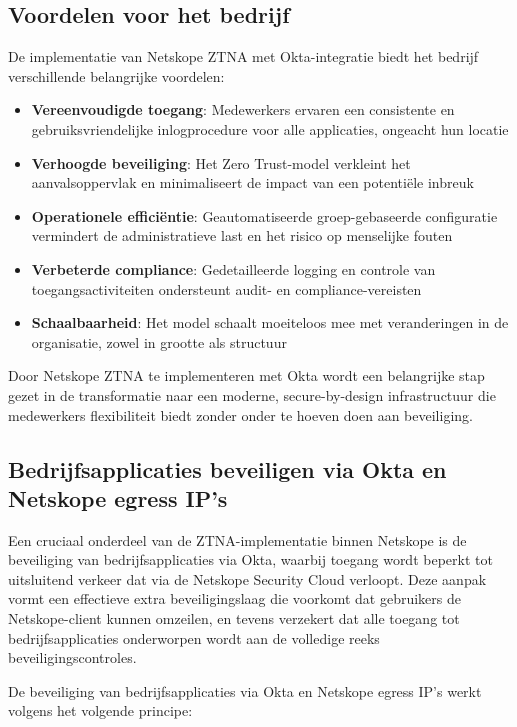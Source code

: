 \subsection{Voordelen voor het bedrijf}
De implementatie van Netskope ZTNA met Okta-integratie biedt het bedrijf verschillende belangrijke voordelen:

\begin{itemize}
    \item \textbf{Vereenvoudigde toegang}: Medewerkers ervaren een consistente en gebruiksvriendelijke inlogprocedure voor alle applicaties, ongeacht hun locatie
    \item \textbf{Verhoogde beveiliging}: Het Zero Trust-model verkleint het aanvalsoppervlak en minimaliseert de impact van een potentiële inbreuk
    \item \textbf{Operationele efficiëntie}: Geautomatiseerde groep-gebaseerde configuratie vermindert de administratieve last en het risico op menselijke fouten
    \item \textbf{Verbeterde compliance}: Gedetailleerde logging en controle van toegangsactiviteiten ondersteunt audit- en compliance-vereisten
    \item \textbf{Schaalbaarheid}: Het model schaalt moeiteloos mee met veranderingen in de organisatie, zowel in grootte als structuur
\end{itemize}

Door Netskope ZTNA te implementeren met Okta wordt een belangrijke stap gezet in de transformatie naar een moderne, secure-by-design infrastructuur die medewerkers flexibiliteit biedt zonder onder te hoeven doen aan beveiliging.

\subsection{Bedrijfsapplicaties beveiligen via Okta en Netskope egress IP's}

Een cruciaal onderdeel van de ZTNA-implementatie binnen Netskope is de beveiliging van bedrijfsapplicaties via Okta, waarbij toegang wordt beperkt tot uitsluitend verkeer dat via de Netskope Security Cloud verloopt. Deze aanpak vormt een effectieve extra beveiligingslaag die voorkomt dat gebruikers de Netskope-client kunnen omzeilen, en tevens verzekert dat alle toegang tot bedrijfsapplicaties onderworpen wordt aan de volledige reeks beveiligingscontroles.

De beveiliging van bedrijfsapplicaties via Okta en Netskope egress IP's werkt volgens het volgende principe:


